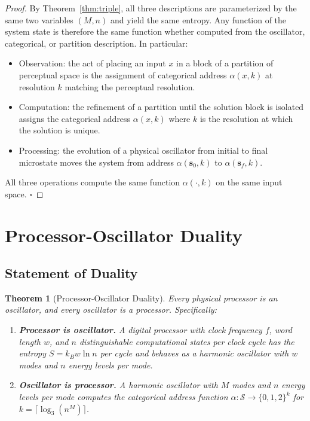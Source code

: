 \documentclass[12pt,twocolumn]{article}
\newtheorem{theorem}{Theorem}[section]
\begin{document}
\begin{proof}
By Theorem~\ref{thm:triple}, all three descriptions are parameterized by the same two variables $(M, n)$ and yield the same entropy. Any function of the system state is therefore the same function whether computed from the oscillator, categorical, or partition description. In particular:
\begin{itemize}
\item Observation: the act of placing an input $x$ in a block of a partition of perceptual space is the assignment of categorical address $\alpha(x, k)$ at resolution $k$ matching the perceptual resolution.
\item Computation: the refinement of a partition until the solution block is isolated assigns the categorical address $\alpha(x, k)$ where $k$ is the resolution at which the solution is unique.
\item Processing: the evolution of a physical oscillator from initial to final microstate moves the system from address $\alpha(\mathbf{s}_0, k)$ to $\alpha(\mathbf{s}_f, k)$.
\end{itemize}
All three operations compute the same function $\alpha(\cdot, k)$ on the same input space. $\square$
\end{proof}

\section{Processor-Oscillator Duality}
\label{sec:duality}

\subsection{Statement of Duality}

\begin{theorem}[Processor-Oscillator Duality]
\label{thm:duality}
Every physical processor is an oscillator, and every oscillator is a processor. Specifically:
\begin{enumerate}
\item \textbf{Processor is oscillator.} A digital processor with clock frequency $f$, word length $w$, and $n$ distinguishable computational states per clock cycle has the entropy $S = k_B w \ln n$ per cycle and behaves as a harmonic oscillator with $w$ modes and $n$ energy levels per mode.

\item \textbf{Oscillator is processor.} A harmonic oscillator with $M$ modes and $n$ energy levels per mode computes the categorical address function $\alpha: \mathcal{S} \to \{0,1,2\}^k$ for $k = \lceil \log_3(n^M) \rceil$.
\end{enumerate}
\end{theorem}
\end{document}
